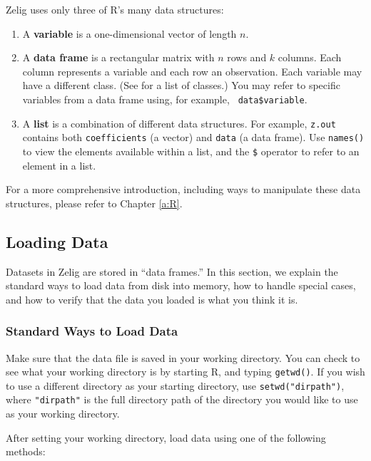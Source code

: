 \documentclass{article}
\begin{document}
Zelig uses only three of R's many data structures: 
\begin{enumerate}
\item A {\bf variable} is a one-dimensional vector of length $n$.
\item A {\bf data frame} is a rectangular matrix with $n$ rows and $k$
  columns.  Each column represents a variable and each row an
  observation.  Each variable may have a different class.  (See
   for a list of classes.)  You may refer to
  specific variables from a data frame using, for example, {\tt
    data\$variable}.
\item A {\bf list} is a combination of different data structures.  For
  example, {\tt z.out} contains both {\tt coefficients} (a vector) and
  {\tt data} (a data frame).  Use {\tt names()} to view the elements
  available within a list, and the {\tt \$} operator to refer to an
  element in a list.
\end{enumerate}

For a more comprehensive introduction, including ways to manipulate
these data structures, please refer to Chapter \ref{a:R}.

\subsection{Loading Data}\label{load.data}

Datasets in Zelig are stored in ``data frames.'' In this section, we
explain the standard ways to load data from disk into memory, how to
handle special cases, and how to verify that the data you loaded is
what you think it is.

\subsubsection*{Standard Ways to Load Data}

Make sure that the data file is saved in your working directory.  You
can check to see what your working directory is by starting R, and
typing {\tt getwd()}.  If you wish to use a different directory as
your starting directory, use \verb|setwd("dirpath")|, where
\verb|"dirpath"| is the full directory path of the directory you would
like to use as your working directory.  

After setting your working directory, load data using one of the
following methods:  
\end{document}
